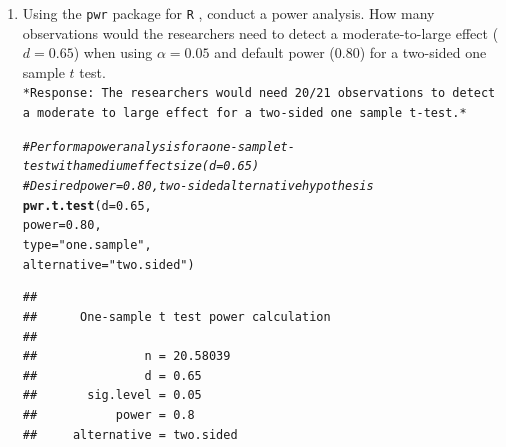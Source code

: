 \documentclass{article}\usepackage[]{graphicx}\usepackage[]{xcolor}
\makeatletter
\newcommand{\hlnum}[1]{\textcolor[rgb]{0.686,0.059,0.569}{#1}}%
\newcommand{\hlsng}[1]{\textcolor[rgb]{0.192,0.494,0.8}{#1}}%
\newcommand{\hlcom}[1]{\textcolor[rgb]{0.678,0.584,0.686}{\textit{#1}}}%
\newcommand{\hldef}[1]{\textcolor[rgb]{0.345,0.345,0.345}{#1}}%
\newcommand{\hlkwc}[1]{\textcolor[rgb]{0.333,0.667,0.333}{#1}}%
\newcommand{\hlkwd}[1]{\textcolor[rgb]{0.737,0.353,0.396}{\textbf{#1}}}%
\newenvironment{kframe}{%
 \def\at@end@of@kframe{}%
 \ifinner\ifhmode%
  \def\at@end@of@kframe{\end{minipage}}%
  \begin{minipage}{\columnwidth}%
 \fi\fi%
 \def\FrameCommand##1{\hskip\@totalleftmargin \hskip-\fboxsep
 \colorbox{shadecolor}{##1}\hskip-\fboxsep
     \hskip-\linewidth \hskip-\@totalleftmargin \hskip\columnwidth}%
 \MakeFramed {\advance\hsize-\width
   \@totalleftmargin\z@ \linewidth\hsize
   \@setminipage}}%
 {\par\unskip\endMakeFramed%
 \at@end@of@kframe}
\newenvironment{knitrout}{}{} %
\makeatother
\begin{document}
\begin{enumerate}
\item Using the \texttt{pwr} package for \texttt{R} \citep{pwr},
conduct a power analysis. How many observations would the researchers 
need to detect a moderate-to-large effect ($d=0.65$) when using 
$\alpha=0.05$ and default power (0.80) for a two-sided one sample 
$t$ test. \\
\texttt{*Response: The researchers would need 20/21 observations to detect a moderate to large effect for a two-sided one sample t-test.*}
\begin{knitrout}\scriptsize
{}\color{fgcolor}\begin{kframe}
\begin{alltt}
\hlcom{# Perform a power analysis for a one-sample t-test with a medium effect size (d = 0.65)}
\hlcom{# Desired power = 0.80, two-sided alternative hypothesis}
\hlkwd{pwr.t.test}\hldef{(}\hlkwc{d} \hldef{=} \hlnum{0.65}\hldef{,}
           \hlkwc{power} \hldef{=} \hlnum{0.80}\hldef{,}
           \hlkwc{type} \hldef{=} \hlsng{"one.sample"}\hldef{,}
           \hlkwc{alternative} \hldef{=} \hlsng{"two.sided"}\hldef{)}
\end{alltt}
\begin{verbatim}
## 
##      One-sample t test power calculation 
## 
##               n = 20.58039
##               d = 0.65
##       sig.level = 0.05
##           power = 0.8
##     alternative = two.sided
\end{verbatim}
\end{kframe}
\end{knitrout}


\end{enumerate}
\end{document}
